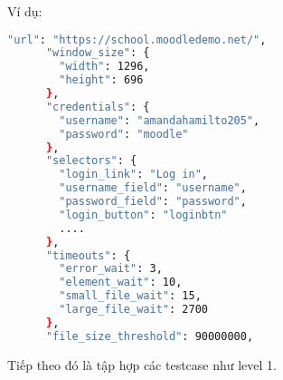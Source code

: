 \noindent Ví dụ:
\begin{lstlisting}[language=bash]
      "url": "https://school.moodledemo.net/",
      "window_size": {
        "width": 1296,
        "height": 696
      },
      "credentials": {
        "username": "amandahamilto205",
        "password": "moodle"
      },
      "selectors": {
        "login_link": "Log in",
        "username_field": "username",
        "password_field": "password",
        "login_button": "loginbtn"
        ....
      },
      "timeouts": {
        "error_wait": 3,
        "element_wait": 10,
        "small_file_wait": 15,
        "large_file_wait": 2700
      },
      "file_size_threshold": 90000000,
\end{lstlisting}
\vspace{10pt}
\noindent Tiếp theo đó là tập hợp các testcase như level 1.